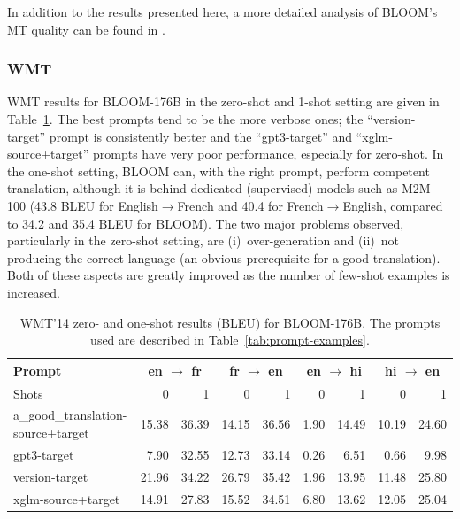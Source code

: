 \documentclass[twoside,11pt]{article}
\begin{document}
In addition to the results presented here, a more detailed analysis of BLOOM's MT quality can be found in \citep{bawden-yvon-2023-mt-bloom}.

\subsubsection{WMT}
\label{sec:eval:mt:wmt}

WMT results for BLOOM-176B in the zero-shot and 1-shot setting are given in Table~\ref{tab:WMT-14enfr-byprompts-0shot}.
The best prompts tend to be the more verbose ones; the ``version-target'' prompt is consistently better and the ``gpt3-target'' and ``xglm-source+target'' prompts have very poor performance, especially for zero-shot. In the one-shot setting, BLOOM can, with the right prompt, perform competent translation, although it is behind dedicated (supervised) models such as M2M-100 (43.8 BLEU for English$\rightarrow$French and 40.4 for French$\rightarrow$English, compared to 34.2 and 35.4 BLEU for BLOOM).
The two major problems observed, particularly in the zero-shot setting, are (i)~over-generation and (ii)~not producing the correct language (an obvious prerequisite for a good translation). Both of these aspects are greatly improved as the number of few-shot examples is increased. 

\begin{table}[ht!]
\centering\small
\addtolength{\tabcolsep}{-2.5pt}
\begin{tabular}{lrr|rr|rr|rr}
\toprule
Prompt & \multicolumn{2}{c}{en $\rightarrow$ fr} & \multicolumn{2}{c}{fr $\rightarrow$ en } & \multicolumn{2}{c}{en $\rightarrow$ hi} & \multicolumn{2}{c}{hi $\rightarrow$ en} \\
\midrule
Shots  & 0 & 1 & 0 & 1 & 0 & 1 & 0 & 1 \\
\midrule
a\_good\_translation-source+target & 15.38 & 36.39 & 14.15 & 36.56 & 1.90 & 14.49 & 10.19 & 24.60  \\
gpt3-target     & 7.90 & 32.55 & 12.73 & 33.14 & 0.26 & 6.51 & 0.66 & 9.98 \\
version-target  & 21.96 & 34.22 & 26.79 & 35.42 & 1.96 & 13.95 & 11.48 & 25.80 \\
xglm-source+target     & 14.91 & 27.83 & 15.52 & 34.51 & 6.80 & 13.62 & 12.05 & 25.04 \\
\bottomrule
\end{tabular}
\caption{WMT'14 zero- and one-shot results (BLEU) for BLOOM-176B. The prompts used are described in Table~\ref{tab:prompt-examples}.}
\label{tab:WMT-14enfr-byprompts-0shot}
\end{table}
\end{document}
